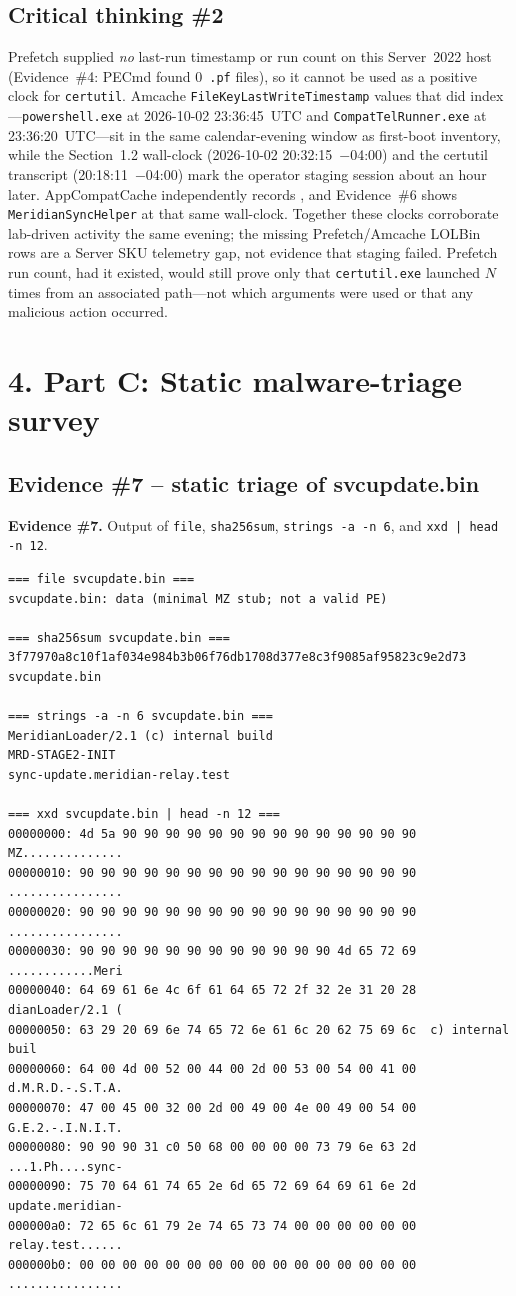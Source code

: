 \documentclass[11pt,letterpaper]{article}
\newcommand{\labpart}[1]{%
  \par\vspace{0.35em}%
  \Needspace{8\baselineskip}%
  \section*{#1}%
  \nopagebreak
}
\newcommand{\labstep}[1]{%
  \Needspace{6\baselineskip}%
  \subsection*{#1}%
  \nopagebreak
}
\newcommand{\evidencebox}[2]{%
  \par\vspace{0.25em}%
  \noindent\colorbox{okbox}{\parbox{\dimexpr\linewidth-2\fboxsep\relax}{%
    \textbf{Evidence \#{#1}.} #2}}%
  \par\vspace{0.25em}%
}
\begin{document}
\labstep{Critical thinking \#2}

Prefetch supplied \emph{no} last-run timestamp or run count on this Server~2022 host
(Evidence~\#4: PECmd found 0~\texttt{.pf} files), so it cannot be used as a positive
clock for \texttt{certutil}. Amcache \texttt{FileKeyLastWriteTimestamp} values that
did index---\texttt{powershell.exe} at 2026-10-02 23:36:45~UTC and
\texttt{CompatTelRunner.exe} at 23:36:20~UTC---sit in the same calendar-evening
window as first-boot inventory, while the Section~1.2 wall-clock
(2026-10-02 20:32:15~$-$04:00) and the  certutil transcript
(20:18:11~$-$04:00) mark the operator staging session about an hour later.
AppCompatCache independently records ,
and Evidence~\#6 shows \texttt{MeridianSyncHelper} at that same wall-clock.
Together these clocks corroborate lab-driven activity the same evening; the
missing Prefetch/Amcache LOLBin rows are a Server SKU telemetry gap, not evidence
that staging failed. Prefetch run count, had it existed, would still prove only
that \texttt{certutil.exe} launched $N$ times from an associated path---not which
arguments were used or that any malicious action occurred.

\labpart{4. Part C: Static malware-triage survey}

\labstep{Evidence \#7 -- static triage of svcupdate.bin}

\evidencebox{7}{Output of \texttt{file}, \texttt{sha256sum}, \texttt{strings -a -n 6}, and \texttt{xxd | head -n 12}.}

\begin{lstlisting}
=== file svcupdate.bin ===
svcupdate.bin: data (minimal MZ stub; not a valid PE)

=== sha256sum svcupdate.bin ===
3f77970a8c10f1af034e984b3b06f76db1708d377e8c3f9085af95823c9e2d73  svcupdate.bin

=== strings -a -n 6 svcupdate.bin ===
MeridianLoader/2.1 (c) internal build
MRD-STAGE2-INIT
sync-update.meridian-relay.test

=== xxd svcupdate.bin | head -n 12 ===
00000000: 4d 5a 90 90 90 90 90 90 90 90 90 90 90 90 90 90  MZ..............
00000010: 90 90 90 90 90 90 90 90 90 90 90 90 90 90 90 90  ................
00000020: 90 90 90 90 90 90 90 90 90 90 90 90 90 90 90 90  ................
00000030: 90 90 90 90 90 90 90 90 90 90 90 90 4d 65 72 69  ............Meri
00000040: 64 69 61 6e 4c 6f 61 64 65 72 2f 32 2e 31 20 28  dianLoader/2.1 (
00000050: 63 29 20 69 6e 74 65 72 6e 61 6c 20 62 75 69 6c  c) internal buil
00000060: 64 00 4d 00 52 00 44 00 2d 00 53 00 54 00 41 00  d.M.R.D.-.S.T.A.
00000070: 47 00 45 00 32 00 2d 00 49 00 4e 00 49 00 54 00  G.E.2.-.I.N.I.T.
00000080: 90 90 90 31 c0 50 68 00 00 00 00 73 79 6e 63 2d  ...1.Ph....sync-
00000090: 75 70 64 61 74 65 2e 6d 65 72 69 64 69 61 6e 2d  update.meridian-
000000a0: 72 65 6c 61 79 2e 74 65 73 74 00 00 00 00 00 00  relay.test......
000000b0: 00 00 00 00 00 00 00 00 00 00 00 00 00 00 00 00  ................
\end{lstlisting}
\end{document}
